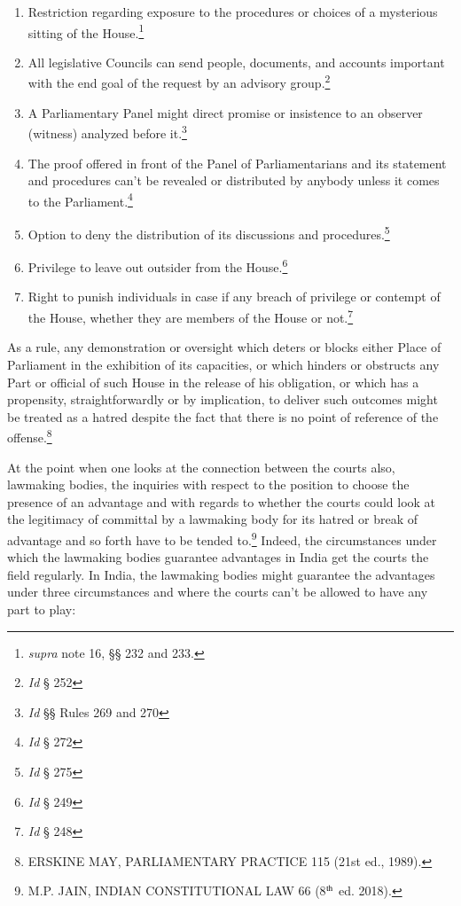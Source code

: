 \begin{multicols}{2}
\begin{enumerate}[label=$\bullet$]
\item Restriction regarding exposure to the procedures or choices of a mysterious
sitting of the House.\footnote{\textit{supra} note 16, §§ 232 and 233.}

\item All legislative Councils can send people, documents, and accounts important
with the end goal of the request by an advisory group.\footnote{\textit{Id} § 252}

\item A Parliamentary Panel might direct promise or insistence to an observer
(witness) analyzed before it.\footnote{\textit{Id} §§ Rules 269 and 270}

\item The proof offered in front of the Panel of Parliamentarians and its statement
and procedures can't be revealed or distributed by anybody unless it comes to
the Parliament.\footnote{\textit{Id} § 272}

\item Option to deny the distribution of its discussions and procedures.\footnote{\textit{Id} § 275}

\item Privilege to leave out outsider from the House.\footnote{\textit{Id} § 249}

\newpage

\item Right to punish individuals in case if any breach of privilege or contempt of the House, whether they are members of the House or not.\footnote{\textit{Id} § 248}
\end{enumerate}

\vspace{-.3cm}


\noi
As a rule, any demonstration or oversight which deters or blocks either Place of Parliament in
the exhibition of its capacities, or which hinders or obstructs any Part or official of such
House in the release of his obligation, or which has a propensity, straightforwardly or by
implication, to deliver such outcomes might be treated as a hatred despite the fact that there is
no point of reference of the offense.\footnote{ERSKINE MAY, PARLIAMENTARY PRACTICE 115 (21st ed., 1989).}

\noi
At the point when one looks at the connection between the courts also, lawmaking bodies, the
inquiries with respect to the position to choose the presence of an advantage and with regards
to whether the courts could look at the legitimacy of committal by a lawmaking body for its
hatred or break of advantage and so forth have to be tended to.\footnote{M.P. JAIN, INDIAN CONSTITUTIONAL LAW 66 (8$^{\rm th}$ ed. 2018).} Indeed, the circumstances under which the lawmaking bodies guarantee advantages in India get the courts the field regularly. In India, the lawmaking bodies might guarantee the advantages under three
circumstances and where the courts can’t be allowed to have any part to play:


\end{multicols}
